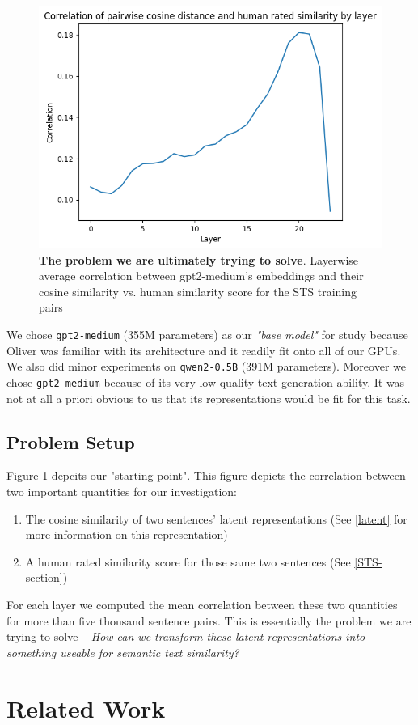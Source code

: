 \documentclass[14pt]{article}
\begin{document}
\begin{figure}[!htb]
    \centering
    \includegraphics[width=0.57\linewidth]{raw_cosine_sim.png}
    \caption{\textbf{The problem we are ultimately trying to solve}. Layerwise average correlation between gpt2-medium's embeddings and their cosine similarity vs. human similarity score for the STS training pairs}
    \label{fig:raw-corr}
\end{figure}
We chose \verb|gpt2-medium| (355M parameters) as our \textit{"base model"} for study because Oliver was familiar with its architecture and it readily fit onto all of our GPUs. We also did minor experiments on \verb|qwen2-0.5B| (391M parameters). Moreover we chose \verb|gpt2-medium| because of its very low quality text generation ability. It was not at all a priori obvious to us that its representations would be fit for this task.

\subsection{Problem Setup}
Figure \ref{fig:raw-corr} depcits our "starting point". This figure depicts the correlation between two important quantities for our investigation:
\begin{enumerate}
    \item The cosine similarity of two sentences' latent representations (See \ref{latent} for more information on this representation)
    \item A human rated similarity score for those same two sentences (See \ref{STS-section})
\end{enumerate}
For each layer we computed the mean correlation between these two quantities for more than five thousand sentence pairs. This is essentially the problem we are trying to solve -- \textit{How can we transform these latent representations into something useable for semantic text similarity?}

\section{Related Work}
\end{document}

